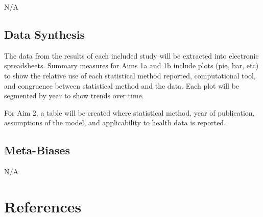 \documentclass[
]{article}
\begin{document}
N/A

\hypertarget{data-synthesis}{%
\subsection{Data Synthesis}\label{data-synthesis}}

The data from the results of each included study will be extracted into
electronic spreadsheets. Summary measures for Aims 1a and 1b include
plots (pie, bar, etc) to show the relative use of each statistical
method reported, computational tool, and congruence between statistical
method and the data. Each plot will be segmented by year to show trends
over time.

For Aim 2, a table will be created where statistical method, year of
publication, assumptions of the model, and applicability to health data
is reported.

\hypertarget{meta-biases}{%
\subsection{Meta-Biases}\label{meta-biases}}

N/A

\hypertarget{references}{%
\section{References}\label{references}}
\end{document}
